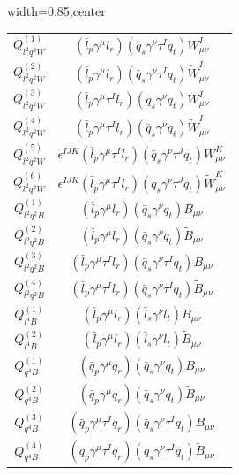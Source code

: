 \begin{table}[H]
\begin{center}
\begin{adjustbox}{width=0.85\textwidth,center}
\begin{minipage}[t]{5.6cm}
\begin{tabular}[t]{c|c}
%
$Q_{l^2q^2W}^{(1)}$  &  $(\bar l_p \gamma^\mu l_r)(\bar q_s \gamma^\nu \tau^I q_t) W^I_{\mu\nu}$ \\
%
$Q_{l^2q^2W}^{(2)}$  &  $(\bar l_p \gamma^\mu l_r)(\bar q_s \gamma^\nu \tau^I q_t) \widetilde W^I_{\mu\nu}$ \\
%
$Q_{l^2q^2W}^{(3)}$  &  $(\bar l_p \gamma^\mu \tau^I l_r)(\bar q_s \gamma^\nu q_t) W^I_{\mu\nu}$ \\
%
$Q_{l^2q^2W}^{(4)}$  &  $(\bar l_p \gamma^\mu \tau^I l_r)(\bar q_s \gamma^\nu q_t) \widetilde W^I_{\mu\nu}$ \\
%
$Q_{l^2q^2W}^{(5)}$  &  $\epsilon^{IJK} (\bar l_p \gamma^\mu \tau^I l_r)(\bar q_s \gamma^\nu \tau^J q_t) W^K_{\mu\nu}$ \\
%
$Q_{l^2q^2W}^{(6)}$  &  $\epsilon^{IJK} (\bar l_p \gamma^\mu \tau^I l_r)(\bar q_s \gamma^\nu \tau^J q_t) \widetilde W^K_{\mu\nu}$ \\
%
$Q_{l^2q^2B}^{(1)}$  &  $(\bar l_p \gamma^\mu l_r)(\bar q_s \gamma^\nu q_t) B_{\mu\nu}$ \\
%
$Q_{l^2q^2B}^{(2)}$  &  $(\bar l_p \gamma^\mu l_r)(\bar q_s \gamma^\nu q_t) \widetilde B_{\mu\nu}$ \\
%
$Q_{l^2q^2B}^{(3)}$  &  $(\bar l_p \gamma^\mu \tau^I l_r)(\bar q_s \gamma^\nu \tau^I q_t) B_{\mu\nu}$ \\
%
$Q_{l^2q^2B}^{(4)}$  &  $(\bar l_p \gamma^\mu \tau^I l_r)(\bar q_s \gamma^\nu \tau^I q_t) \widetilde B_{\mu\nu}$ \\ \hdashline
%
$Q_{l^4B}^{(1)}$  &  $(\bar l_p \gamma^\mu l_r) (\bar l_s \gamma^\nu l_t) B_{\mu\nu}$ \\
%
$Q_{l^4B}^{(2)}$  &  $(\bar l_p \gamma^\mu l_r) (\bar l_s \gamma^\nu l_t) \widetilde B_{\mu\nu}$ \\
%
$Q_{q^4B}^{(1)}$  & $(\bar q_p \gamma^\mu q_r) (\bar q_s \gamma^\nu q_t) B_{\mu\nu}$ \\
%
$Q_{q^4B}^{(2)}$  & $(\bar q_p \gamma^\mu q_r) (\bar q_s \gamma^\nu q_t) \widetilde B_{\mu\nu}$ \\
%
$Q_{q^4B}^{(3)}$  & $(\bar q_p \gamma^\mu \tau^I q_r) (\bar q_s \gamma^\nu \tau^I q_t) B_{\mu\nu}$ \\
%
$Q_{q^4B}^{(4)}$  & $(\bar q_p \gamma^\mu \tau^I q_r) (\bar q_s \gamma^\nu \tau^I q_t) \widetilde B_{\mu\nu}$
\end{tabular}
\end{minipage}
\hspace{1cm}
\begin{minipage}[t]{6.1cm}
\renewcommand{\arraystretch}{1.5}
\begin{tabular}[t]{c|c}

\end{tabular}
\end{minipage}
\end{adjustbox}
\end{center}
\end{table}
